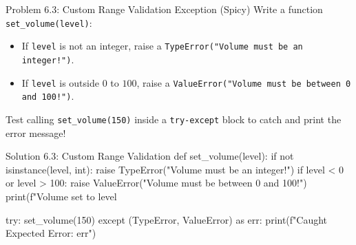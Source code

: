 \begin{snakelab}{Problem 6.3: Custom Range Validation Exception (Spicy)}
Write a function \texttt{set\_volume(level)}:
\begin{itemize}
    \item If \texttt{level} is not an integer, raise a \texttt{TypeError("Volume must be an integer!")}.
    \item If \texttt{level} is outside $0$ to $100$, raise a \texttt{ValueError("Volume must be between 0 and 100!")}.
\end{itemize}
Test calling \texttt{set\_volume(150)} inside a \texttt{try-except} block to catch and print the error message!
\end{snakelab}

\begin{pycode}{Solution 6.3: Custom Range Validation}
def set_volume(level):
    if not isinstance(level, int):
        raise TypeError("Volume must be an integer!")
    if level < 0 or level > 100:
        raise ValueError("Volume must be between 0 and 100!")
    print(f"Volume set to {level}%

try:
    set_volume(150)
except (TypeError, ValueError) as err:
    print(f"Caught Expected Error: {err}")
\end{pycode}
